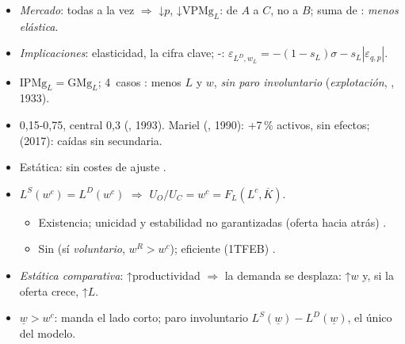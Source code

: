 \documentclass{article}
\begin{document}
\begin{columnas}
\begin{itemize}
\item \emph{Mercado}: todas a la vez $\Rightarrow$ ↓$p$, ↓$\mathrm{VPMg}_L$: de $A$ a $C$, no a $B$; suma de : \emph{menos elástica}.
\end{itemize}
\begin{itemize}
\item \emph{Implicaciones}: elasticidad, la cifra clave; -: $\varepsilon_{L^D,w_L}=-(1-s_L)\sigma-s_L|\varepsilon_{q,p}|$.
\end{itemize}
\begin{itemize}
\item $\mathrm{IPMg}_L=\mathrm{GMg}_L$; 4~casos : menos $L$ y $w$, \emph{sin paro involuntario} (\emph{explotación}, , 1933).
\end{itemize}
\begin{itemize}
\item 0,15-0,75, central 0,3 (, 1993). Mariel (, 1990): +7\,\% activos, sin efectos;  (2017): caídas sin secundaria.
\item Estática: sin costes de ajuste .
\end{itemize}

\begin{itemize}
\item $L^S(w^c)=L^D(w^c)$ $\Rightarrow$ $U_O/U_C=w^c=F_L(L^c,\overline{K})$.
  \begin{itemize}
  \item Existencia; unicidad y estabilidad no garantizadas (oferta hacia atrás) .
  \item Sin  (sí \emph{voluntario}, $w^R>w^c$); eficiente (1TFEB) .
  \end{itemize}
\item \emph{Estática comparativa}: ↑productividad $\Rightarrow$ la demanda se desplaza: ↑$w$ y, si la oferta crece, ↑$L$.
\item {} $\underline{w}>w^c$: manda el lado corto; paro involuntario $L^S(\underline{w})-L^D(\underline{w})$, el único del modelo.
\end{itemize}


\end{columnas}
\end{document}
